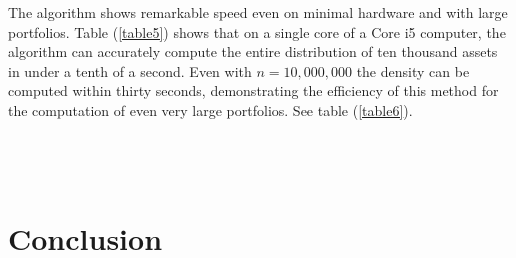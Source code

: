 \documentclass[12pt]{article}
\theoremstyle{definition}
\begin{document}
The algorithm shows remarkable speed even on minimal hardware and with large portfolios.   Table (\ref{table5}) shows that on a single core of a Core i5 computer, the algorithm can accurately compute the entire distribution of ten thousand assets in under a tenth of a second.  Even with \(n=10,000,000\) the density can be computed within thirty seconds, demonstrating the efficiency of this method for the computation of even very large portfolios.  See table (\ref{table6}).
\\
\\

\\
\\




\section{Conclusion}
\end{document}
